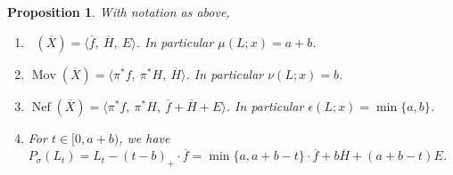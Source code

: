 \documentclass[12pt]{amsart}
\newtheorem{proposition}[lemma]{Proposition}
\theoremstyle{definition}
\DeclareMathOperator{\Nef}{Nef}
\DeclareMathOperator{\Eff}{\overline{Eff}}
\DeclareMathOperator{\Mov}{Mov}
\newcommand{\?}{ \circled{{\large\bf ?}}}
\begin{document}
\begin{proposition}\label{prop:blCxP2positive}
	With notation as above,
	\begin{enumerate}[(1)]
		\item $\Eff(\overline X)=\langle\overline f,\ \overline H,\ E\rangle$. In particular $\mu(L;x)=a+b$.
		\smallskip
		
		\item $\Mov(\overline X)=\langle \pi^*f,\ \pi^*H,\ \overline H\rangle$.  In particular $\nu(L;x)=b$.
		\smallskip
		
		\item $\Nef(\overline X)=\langle \pi^*f,\ \pi^*H,\ \overline f+\overline H+E\rangle$. In particular $\epsilon(L;x)=\min\{a,b\}$. 
		\smallskip
		
		\item For $t\in[0,a+b)$, we have $P_{\sigma}(L_t)=L_t-(t-b)_+\cdot\overline f=\min\{a,a+b-t\}\cdot\overline f+b\overline H+(a+b-t)E$.
	\end{enumerate}
\end{proposition}
\end{document}
